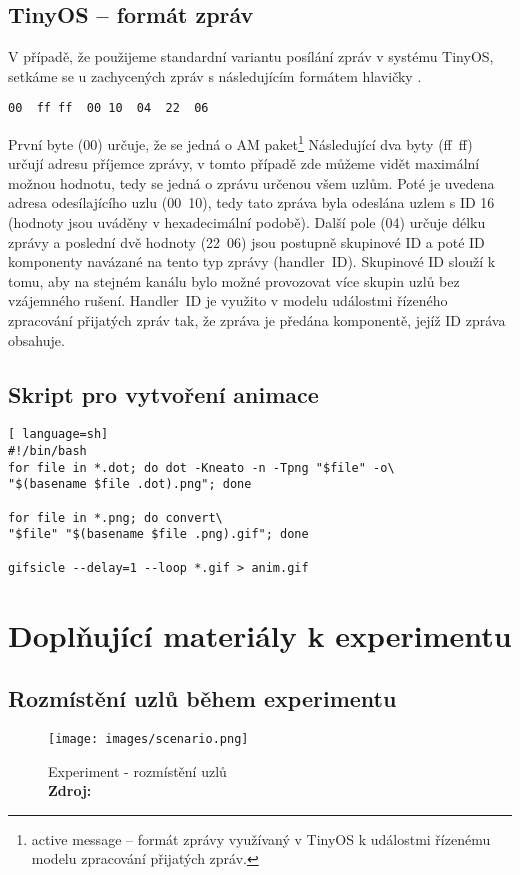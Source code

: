 \documentclass[11pt,final,twoside]{fithesis2}
\newcommand*{\captionsource}[2]{%
  \caption[{#1}]{%
    #1%
    \\\hspace{\linewidth}%
    \textbf{Zdroj:} #2%
  }%
}
\begin{document}
\section{TinyOS -- formát zpráv} \label{sec:msg}

V případě, že použijeme standardní variantu posílání zpráv v systému TinyOS, setkáme se u zachycených zpráv s následujícím formátem hlavičky \cite{TinyOSmsgs}.

\begin{verbatim}
00  ff ff  00 10  04  22  06
\end{verbatim}

První byte (00) určuje, že se jedná o AM paket\footnote{active message -- formát zprávy využívaný v TinyOS k událostmi řízenému modelu zpracování přijatých zpráv.}
Následující dva byty (ff~ff) určují adresu příjemce zprávy, v tomto případě zde můžeme vidět maximální možnou hodnotu, tedy se jedná o zprávu určenou všem uzlům.
Poté je uvedena adresa odesílajícího uzlu (00~10), tedy tato zpráva byla odeslána uzlem s ID 16 (hodnoty jsou uváděny v hexadecimální podobě). Další pole (04) určuje délku zprávy
a poslední dvě hodnoty (22~06) jsou postupně skupinové ID a poté ID komponenty navázané na tento typ zprávy (handler~ID). Skupinové ID slouží k tomu, aby na stejném kanálu bylo možné provozovat více
skupin uzlů bez vzájemného rušení. Handler~ID je využito v modelu událostmi řízeného zpracování přijatých zpráv tak, že zpráva je předána komponentě, jejíž ID zpráva obsahuje. 


\section{Skript pro vytvoření animace}\label{sec:script}
\begin{lstlisting}[ language=sh]
#!/bin/bash
for file in *.dot; do dot -Kneato -n -Tpng "$file" -o\
"$(basename $file .dot).png"; done

for file in *.png; do convert\
"$file" "$(basename $file .png).gif"; done

gifsicle --delay=1 --loop *.gif > anim.gif

\end{lstlisting}


\chapter{Doplňující materiály k experimentu}

\section{Rozmístění uzlů během experimentu}
\begin{figure}[h]
     \centering
     \texttt{[image: images/scenario.png]}
     \captionsource{Experiment - rozmístění uzlů}{\cite{Svenda2014}}
     \label{img:scenario}
\end{figure}
\end{document}
